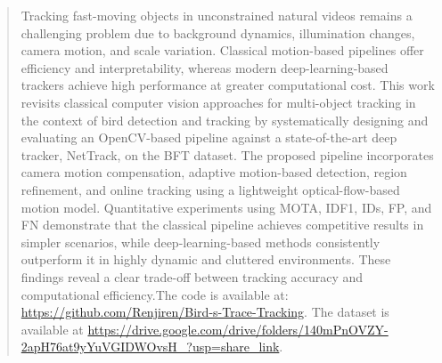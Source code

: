 \begin{abstract}

Tracking fast-moving objects in unconstrained natural videos remains a challenging problem due to background dynamics, illumination changes, camera motion, and scale variation. Classical motion-based pipelines offer efficiency and interpretability, whereas modern deep-learning-based trackers achieve high performance at greater computational cost. This work revisits classical computer vision approaches for multi-object tracking in the context of bird detection and tracking by systematically designing and evaluating an OpenCV-based pipeline against a state-of-the-art deep tracker, NetTrack, on the BFT dataset. The proposed pipeline incorporates camera motion compensation, adaptive motion-based detection, region refinement, and online tracking using a lightweight optical-flow-based motion model. Quantitative experiments using MOTA, IDF1, IDs, FP, and FN demonstrate that the classical pipeline achieves competitive results in simpler scenarios, while deep-learning-based methods consistently outperform it in highly dynamic and cluttered environments. These findings reveal a clear trade-off between tracking accuracy and computational efficiency.The code is available at: \url{https://github.com/Renjiren/Bird-s-Trace-Tracking}. The dataset is available at \url{https://drive.google.com/drive/folders/140mPnOVZY-2apH76at9yYuVGIDWOvsH_?usp=share_link}.

\end{abstract}